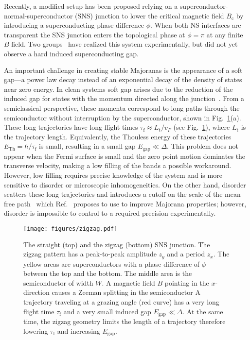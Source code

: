 \documentclass[english, twocolumn, 10pt, aps, superscriptaddress, floatfix, prb, citeautoscript]{revtex4-1}
\renewcommand{\comment}[2]{#2}
\begin{document}
\comment{SNS junctions also work and require smaller field.}
Recently, a modified setup has been proposed\cite{Pientka2017,Hell2017} relying on a superconductor-normal-superconductor (SNS) junction to lower the critical magnetic field $B_\textrm{c}$ by introducing a superconducting phase difference $\phi$.
When both NS interfaces are transparent the SNS junction enters the topological phase at $\phi=\pi$ at any finite $B$ field.
Two groups~\cite{Fornieri2018,Ren2018} have realized this system experimentally, but did not yet observe a hard induced superconducting gap.

\comment{The gap is small because of long trajectories.}
An important challenge in creating stable Majoranas is the appearance of a soft gap---a power law decay instead of an exponential decay of the density of states near zero energy.
In clean systems soft gap arises due to the reduction of the induced gap for states with the momentum directed along the junction~\cite{Gennes1963,Beenakker2005}.
From a semiclassical perspective, these momenta correspond to long paths through the semiconductor without interruption by the superconductor, shown in Fig.~\ref{fig:setup}(a).
These long trajectories have long flight times $\tau_\textrm{f} \approx L_\textrm{t} / v_F$ (see Fig.~\ref{fig:setup}), where $L_\textrm{t}$ is the trajectory length.
Equivalently, the Thouless energy of these trajectories $E_{\textrm{Th}}=\hbar / \tau_\textrm{f}$ is small, resulting in a small gap $E_\textrm{gap} \ll \Delta$.
This problem does not appear when the Fermi surface is small and the zero point motion dominates the transverse velocity, making a low filling of the bands a possible workaround\cite{Beenakker2005,Nijholt2015}.
However, low filling requires precise knowledge of the system and is more sensitive to disorder or microscopic inhomogeneities.
On the other hand, disorder scatters these long trajectories and introduces a cutoff on the scale of the mean free path~\cite{Golubov1988,Belzig1996,Pilgram2000} which Ref.~ proposes to use to improve Majorana properties; however, disorder is impossible to control to a required precision experimentally.

\begin{figure}[!htb]
\centering
\texttt{[image: figures/zigzag.pdf]}
\caption{The straight (top) and the zigzag (bottom) SNS junction.
The zigzag pattern has a peak-to-peak amplitude $z_y$ and a period $z_x$.
The yellow areas are superconductors with a phase difference of $\phi$ between the top and the bottom.
The middle area is the semiconductor of width $W$.
A magnetic field $B$ pointing in the $x$-direction causes a Zeeman splitting in the semiconductor
A trajectory traveling at a grazing angle (red curve) has a very long flight time $\tau_\textrm{f}$ and a very small induced gap $E_\textrm{gap} \ll \Delta$.
At the same time, the zigzag geometry limits the length of a trajectory therefore lowering $\tau_\textrm{f}$ and increasing $E_\textrm{gap}$.
\label{fig:setup}}
\end{figure}
\end{document}
